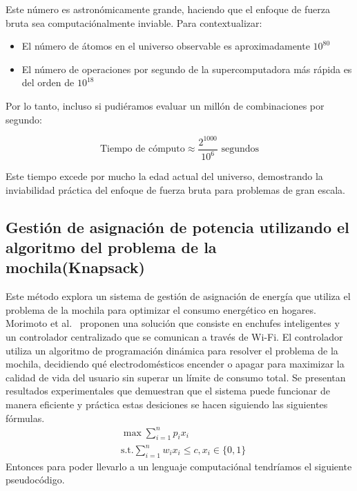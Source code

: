 \documentclass[9pt,a4paper,twoside]{rho-class/rho}
\begin{document}
            Este número es astronómicamente grande, haciendo que el enfoque de fuerza bruta sea computaciónalmente inviable. Para contextualizar:

            \begin{itemize}
                \item El número de átomos en el universo observable es aproximadamente $10^{80}$
                \item El número de operaciones por segundo de la supercomputadora más rápida es del orden de $10^{18}$
            \end{itemize}

            Por lo tanto, incluso si pudiéramos evaluar un millón de combinaciones por segundo:

            \begin{equation}
                \text{Tiempo de cómputo} \approx \frac{2^{1000}}{10^6} \text{ segundos}
            \end{equation}

            Este tiempo excede por mucho la edad actual del universo, demostrando la inviabilidad práctica del enfoque de fuerza bruta para problemas de gran escala.
                
        \subsection[Gestión de asignación de potencia (Knapsack)]{Gestión de asignación de potencia utilizando el algoritmo del problema de la mochila(Knapsack)}

            Este método explora un sistema de gestión de asignación de energía que utiliza el problema de la mochila para optimizar el consumo energético en hogares.  Morimoto et al.~\cite{Morimoto2014} proponen una solución que consiste en enchufes inteligentes y un controlador centralizado que se comunican a través de Wi-Fi. El controlador utiliza un algoritmo de programación dinámica para resolver el problema de la mochila, decidiendo qué electrodomésticos encender o apagar para maximizar la calidad de vida del usuario sin superar un límite de consumo total. Se presentan resultados experimentales que demuestran que el sistema puede funcionar de manera eficiente y práctica estas desiciones se hacen siguiendo las siguientes fórmulas.
            \begin{align}
                &\max \sum_{i=1}^{n} p_ix_i \\
                &\text{s.t.} \sum_{i=1}^{n} w_ix_i \leq c, x_i \in \{0,1\}
            \end{align}
            Entonces para poder llevarlo a un lenguaje computaciónal tendríamos el siguiente pseudocódigo.
            
\end{document}
